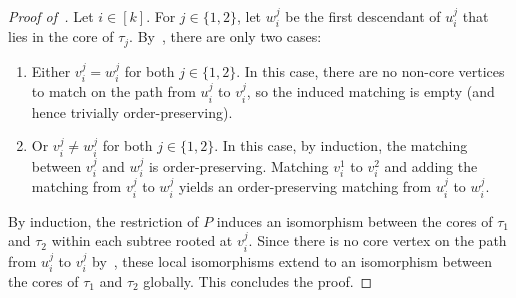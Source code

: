 \begin{proof}[Proof of~]
    Let $i\in[k]$. For $j\in\{1,2\}$, let $w_i^j$ be the first descendant of
    $u_i^j$ that lies in the core of $\tau_j$. By~, there are
    only two cases:
    
    \begin{enumerate}
        \item Either $v_i^j = w_i^j$ for both $j\in\{1,2\}$. In this case, there are no
        non-core vertices to match on the path from $u_i^j$ to $v_i^j$, so the
        induced matching is empty (and hence trivially order-preserving).
        
        \item Or $v_i^j \neq w_i^j$ for both $j\in\{1,2\}$. In this case, by induction,
        the matching between $v_i^j$ and $w_i^j$ is order-preserving. Matching
        $v_i^1$ to $v_i^2$ and adding the matching from $v_i^j$ to $w_i^j$
        yields an order-preserving matching from $u_i^j$ to $w_i^j$.
    \end{enumerate}

    By induction, the restriction of $P$ induces an isomorphism between the cores of
    $\tau_1$ and $\tau_2$ within each subtree rooted at $v_i^j$. Since there is no
    core vertex on the path from $u_i^j$ to $v_i^j$ by~, these
    local isomorphisms extend to an isomorphism between the cores of $\tau_1$ and
    $\tau_2$ globally. This concludes the proof. 
\end{proof}


